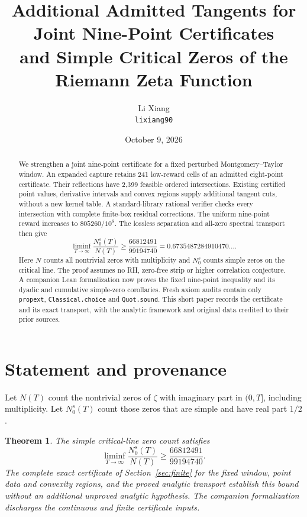 \documentclass[11pt,a4paper]{article}
\title{Additional Admitted Tangents for Joint Nine-Point Certificates\\
and Simple Critical Zeros of the Riemann Zeta Function}
\author{Li Xiang\\\small \texttt{lixiang90}}
\date{October 9, 2026}
\newtheorem{theorem}{Theorem}[section]
\begin{document}
\maketitle
\begin{abstract}
We strengthen a joint nine-point certificate for a fixed perturbed
Montgomery--Taylor window. An expanded capture retains 241 low-reward
cells of an admitted eight-point certificate. Their reflections have
2,399 feasible ordered intersections. Existing certified point values,
derivative intervals and convex regions supply additional tangent cuts,
without a new kernel table. A standard-library rational verifier checks
every intersection with complete finite-box residual corrections.
The uniform nine-point reward increases to $805260/10^8$. The lossless
separation and all-zero spectral transport then give
\[
 \liminf_{T\to\infty}\frac{N_0^s(T)}{N(T)}
 \ge\frac{66812491}{99194740}=0.6735487284910470\ldots.
\]
Here $N$ counts all nontrivial zeros with multiplicity and $N_0^s$
counts simple zeros on the critical line. The proof assumes no RH,
zero-free strip or higher correlation conjecture. A companion Lean
formalization now proves the fixed nine-point inequality and its dyadic
and cumulative simple-zero corollaries. Fresh axiom audits contain only
\texttt{propext}, \texttt{Classical.choice} and \texttt{Quot.sound}.
This short paper records the certificate and its exact transport, with
the analytic framework and original data credited to their prior sources.
\end{abstract}

\section{Statement and provenance}

Let $N(T)$ count the nontrivial zeros of $\zeta$ with imaginary part in
$(0,T]$, including multiplicity. Let $N_0^s(T)$ count those zeros that
are simple and have real part $1/2$.

\begin{theorem}\label{thm:main}
The simple critical-line zero count satisfies
\[
 \liminf_{T\to\infty}\frac{N_0^s(T)}{N(T)}\ge\frac{66812491}{99194740}.
\]
The complete exact certificate of Section~\ref{sec:finite} for the fixed
window, point data and convexity regions, and the proved analytic
transport establish this bound without an additional unproved analytic
hypothesis. The companion formalization discharges the continuous and
finite certificate inputs.
\end{theorem}
\end{document}
